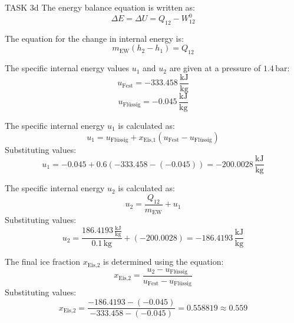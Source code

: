 TASK 3d  
The energy balance equation is written as:  
\[
\Delta E = \Delta U = Q_{12} - W_{12}^0
\]  

The equation for the change in internal energy is:  
\[
m_{\text{EW}} (h_2 - h_1) = Q_{12}
\]  

The specific internal energy values \( u_1 \) and \( u_2 \) are given at a pressure of \( 1.4 \, \text{bar} \):  
\[
u_{\text{Fest}} = -333.458 \, \frac{\text{kJ}}{\text{kg}}
\]  
\[
u_{\text{Flüssig}} = -0.045 \, \frac{\text{kJ}}{\text{kg}}
\]  

The specific internal energy \( u_1 \) is calculated as:  
\[
u_1 = u_{\text{Flüssig}} + x_{\text{Eis,1}} (u_{\text{Fest}} - u_{\text{Flüssig}})
\]  
Substituting values:  
\[
u_1 = -0.045 + 0.6 (-333.458 - (-0.045)) = -200.0028 \, \frac{\text{kJ}}{\text{kg}}
\]  

The specific internal energy \( u_2 \) is calculated as:  
\[
u_2 = \frac{Q_{12}}{m_{\text{EW}}} + u_1
\]  
Substituting values:  
\[
u_2 = \frac{186.4193 \, \frac{\text{kJ}}{\text{kg}}}{0.1 \, \text{kg}} + (-200.0028) = -186.4193 \, \frac{\text{kJ}}{\text{kg}}
\]  

The final ice fraction \( x_{\text{Eis,2}} \) is determined using the equation:  
\[
x_{\text{Eis,2}} = \frac{u_2 - u_{\text{Flüssig}}}{u_{\text{Fest}} - u_{\text{Flüssig}}}
\]  
Substituting values:  
\[
x_{\text{Eis,2}} = \frac{-186.4193 - (-0.045)}{-333.458 - (-0.045)} = 0.558819 \approx 0.559
\]